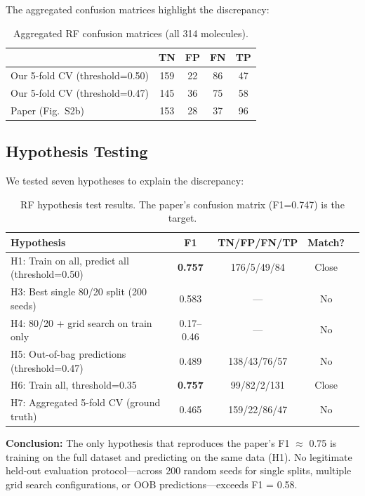 \documentclass[11pt,a4paper]{article}
\begin{document}
The aggregated confusion matrices highlight the discrepancy:

\begin{table}[H]
\centering
\caption{Aggregated RF confusion matrices (all 314 molecules).}
\label{tab:rf_cm}
\begin{tabular}{lcccc}
\toprule
 & TN & FP & FN & TP \\
\midrule
Our 5-fold CV (threshold=0.50) & 159 & 22 & 86 & 47 \\
Our 5-fold CV (threshold=0.47) & 145 & 36 & 75 & 58 \\
Paper (Fig.~S2b) & 153 & 28 & 37 & 96 \\
\bottomrule
\end{tabular}
\end{table}

\subsection{Hypothesis Testing}
\label{sec:rf_hypotheses}

We tested seven hypotheses to explain the discrepancy:

\begin{table}[H]
\centering
\caption{RF hypothesis test results. The paper's confusion matrix (F1=0.747) is the target.}
\label{tab:rf_hyp}
\begin{tabular}{p{7cm}cccc}
\toprule
Hypothesis & F1 & TN/FP/FN/TP & Match? \\
\midrule
H1: Train on all, predict all (threshold=0.50) & \textbf{0.757} & 176/5/49/84 & \textcolor{matchgreen}{Close} \\
H3: Best single 80/20 split (200 seeds) & 0.583 & --- & No \\
H4: 80/20 + grid search on train only & 0.17--0.46 & --- & No \\
H5: Out-of-bag predictions (threshold=0.47) & 0.489 & 138/43/76/57 & No \\
H6: Train all, threshold=0.35 & \textbf{0.757} & 99/82/2/131 & \textcolor{matchgreen}{Close} \\
H7: Aggregated 5-fold CV (ground truth) & 0.465 & 159/22/86/47 & No \\
\bottomrule
\end{tabular}
\end{table}

\textbf{Conclusion:} The only hypothesis that reproduces the paper's F1 $\approx$ 0.75 is training on the full dataset and predicting on the same data (H1). No legitimate held-out evaluation protocol---across 200 random seeds for single splits, multiple grid search configurations, or OOB predictions---exceeds F1 = 0.58.
\end{document}
